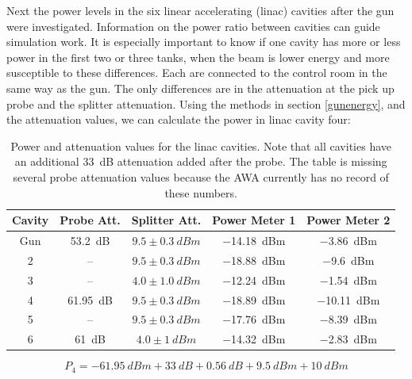Next the power levels in the six linear accelerating (linac) cavities after the gun
were investigated. Information on the power ratio between cavities can 
guide simulation work. It is especially important to know if one cavity
has more or less power in the first two or three tanks, when the beam is 
lower energy and more susceptible to these differences.
Each are connected to the control room in the same way as the gun. 
The only differences are in the attenuation at the pick up probe and 
the splitter attenuation. Using the methods in section \ref{gunenergy}, 
and the attenuation values, we can calculate the power in linac cavity four:
\begin{table} %
	\caption{\label{tab:powerlinac} Power and attenuation values for the 
		linac cavities. Note that all cavities have an additional 
		\SI{33}{dB} attenuation added after the probe.
		The table is missing several probe attenuation values because the
		AWA currently has no record of these numbers.}
	\begin{center}
		\begin{tabular}{ccccc}	
			\toprule
			\toprule
			\textbf{Cavity} & \textbf{Probe Att.} & \textbf{Splitter Att.} & \textbf{Power Meter 1}  & \textbf{Power Meter 2} \\
			\midrule
			Gun & \SI{53.2}{dB}& $9.5 \pm \SI{0.3}{dBm}$ & \SI{-14.18}{dBm} & \SI{-3.86}{dBm}  \\
			2 & --       & $9.5 \pm \SI{0.3}{dBm}$ & \SI{-18.88}{dBm} & \SI{-9.6}{dBm}  \\
			3 & --       & $4.0 \pm \SI{1.0}{dBm}$ & \SI{-12.24}{dBm} & \SI{-1.54}{dBm}  \\
			4 & \SI{61.95}{dB} & $9.5 \pm \SI{0.3}{dBm}$ & \SI{-18.89}{dBm} & \SI{-10.11}{dBm}  \\
			5 & --       & $9.5 \pm \SI{0.3}{dBm}$ & \SI{-17.76}{dBm} & \SI{-8.39}{dBm}  \\
			6 & \SI{61}{dB}    & $4.0 \pm \SI{1}{dBm}$  & \SI{-14.32}{dBm} & \SI{-2.83}{dBm} \\
			\bottomrule
		\end{tabular}
	\end{center}
\end{table}
\begin{equation}
P_4 = \SI{-61.95}{dBm} + \SI{33}{dB} + \SI{0.56}{dB} + \SI{9.5}{dBm} +\SI{10}{dBm}
\end{equation}



